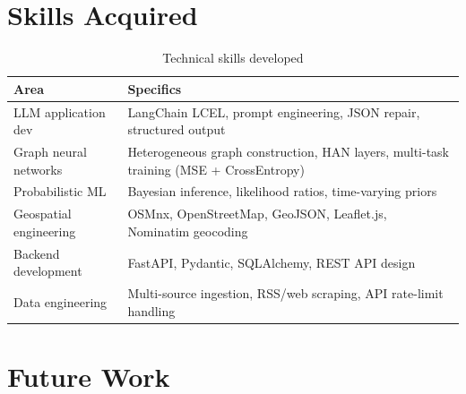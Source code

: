 \begin{table}[H]
\centering
{}
\caption{Hypothesis status at end of internship}
\end{table}

\section{Skills Acquired}

\begin{table}[H]
\centering
\begin{tabular}{ll}
\toprule
\textbf{Area} & \textbf{Specifics} \\
\midrule
LLM application dev    & LangChain LCEL, prompt engineering, JSON repair,
                         structured output \\
Graph neural networks  & Heterogeneous graph construction, HAN layers,
                         multi-task training (MSE + CrossEntropy) \\
Probabilistic ML       & Bayesian inference, likelihood ratios,
                         time-varying priors \\
Geospatial engineering & OSMnx, OpenStreetMap, GeoJSON, Leaflet.js,
                         Nominatim geocoding \\
Backend development    & FastAPI, Pydantic, SQLAlchemy, REST API design \\
Data engineering       & Multi-source ingestion, RSS/web scraping,
                         API rate-limit handling \\
\bottomrule
\end{tabular}
\caption{Technical skills developed}
\end{table}

\section{Future Work}

